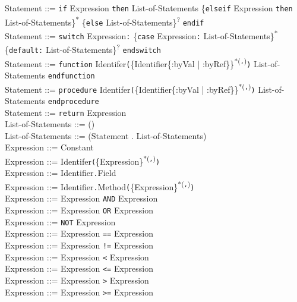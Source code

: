 \documentclass{article}
\begin{document}
\noindent
Statement ::= \texttt{if} Expression \texttt{then} List-of-Statements \{\texttt{elseif} Expression \texttt{then} List-of-Statements\}\textsuperscript{*} \{\texttt{else} List-of-Statements\}\textsuperscript{?} \texttt{endif}\\
Statement ::= \texttt{switch} Expression\texttt{:} \{\texttt{case} Expression\texttt{:} List-of-Statements\}\textsuperscript{*} \{\texttt{default:} List-of-Statements\}\textsuperscript{?} \texttt{endswitch}\\

\noindent
Statement ::= \texttt{function} Identifer\texttt{(}\{Identifier\{:byVal | :byRef\}\}\textsuperscript{*(\texttt{,})}\texttt{)} List-of-Statements \texttt{endfunction}\\
Statement ::= \texttt{procedure} Identifer\texttt{(}\{Identifier\{:byVal | :byRef\}\}\textsuperscript{*(\texttt{,})}\texttt{)} List-of-Statements \texttt{endprocedure}\\
Statement ::= \texttt{return} Expression\\

\noindent
List-of-Statements ::= ()\\
List-of-Statements ::= (Statement . List-of-Statements)\\

\noindent
Expression ::= Constant\\
Expression ::= Identifer\texttt{(}\{Expression\}\textsuperscript{*(\texttt{,})}\texttt{)}\\
Expression ::= Identifier\texttt{.}Field\\
Expression ::= Identifier\texttt{.}Method\texttt{(}\{Expression\}\textsuperscript{*(\texttt{,})}\texttt{)}\\

\noindent
Expression ::= Expression \texttt{AND} Expression\\
Expression ::= Expression \texttt{OR} Expression\\
Expression ::= \texttt{NOT} Expression\\

\noindent
Expression ::= Expression \texttt{==} Expression\\
Expression ::= Expression \texttt{!=} Expression\\
Expression ::= Expression \texttt{\textless{}} Expression\\
Expression ::= Expression \texttt{\textless=} Expression\\
Expression ::= Expression \texttt{\textgreater{}} Expression\\
Expression ::= Expression \texttt{\textgreater=} Expression\\
\end{document}
